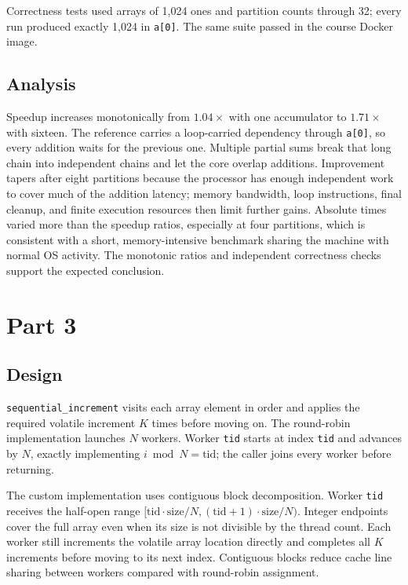 \documentclass[11pt]{article}
\begin{document}
Correctness tests used arrays of 1,024 ones and partition counts through 32;
every run produced exactly 1,024 in \texttt{a[0]}.  The same suite passed in
the course Docker image.

\subsection{Analysis}

Speedup increases monotonically from $1.04\times$ with one accumulator to
$1.71\times$ with sixteen.  The reference carries a loop-carried dependency
through \texttt{a[0]}, so every addition waits for the previous one.  Multiple
partial sums break that long chain into independent chains and let the core
overlap additions.  Improvement tapers after eight partitions because the
processor has enough independent work to cover much of the addition latency;
memory bandwidth, loop instructions, final cleanup, and finite execution
resources then limit further gains.  Absolute times varied more than the
speedup ratios, especially at four partitions, which is consistent with a
short, memory-intensive benchmark sharing the machine with normal OS
activity.  The monotonic ratios and independent correctness checks support the
expected conclusion.

\section{Part 3}

\subsection{Design}

\texttt{sequential\_increment} visits each array element in order and applies
the required volatile increment $K$ times before moving on.  The round-robin
implementation launches $N$ workers.  Worker \texttt{tid} starts at index
\texttt{tid} and advances by $N$, exactly implementing
$i \bmod N=\mathrm{tid}$; the caller joins every worker before returning.

The custom implementation uses contiguous block decomposition.  Worker
\texttt{tid} receives the half-open range
$[\mathrm{tid}\cdot\mathrm{size}/N,
(\mathrm{tid}+1)\cdot\mathrm{size}/N)$.  Integer endpoints cover the full
array even when its size is not divisible by the thread count.  Each worker
still increments the volatile array location directly and completes all $K$
increments before moving to its next index.  Contiguous blocks reduce cache
line sharing between workers compared with round-robin assignment.
\end{document}
